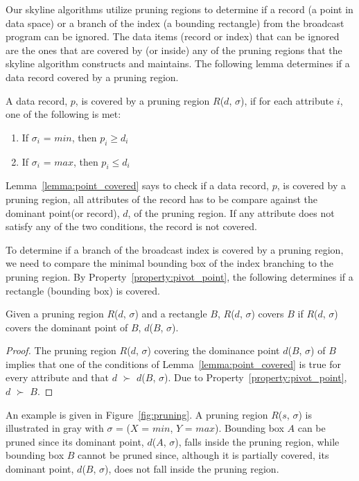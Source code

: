 Our skyline algorithms utilize pruning regions to determine if a record (a point in data space) or a branch of the index (a bounding rectangle) from the broadcast program can be ignored. The data items (record or index) that can be ignored are the ones that are covered by (or inside) any of the pruning regions that the skyline algorithm constructs and maintains. The following lemma determines if a data record covered by a pruning region.

\begin{lemma}\label{lemma:point_covered}
A data record, $p$, is covered by a pruning region $R$($d$, $\sigma$), if for each attribute $i$, one of the following is met:
\begin{enumerate}
  \item If $\sigma_i$ = $min$, then $p_i \geq d_i$
  \item If $\sigma_i$ = $max$, then $p_i \leq d_i$
\end{enumerate}
\end{lemma}

Lemma~\ref{lemma:point_covered} says to check if a data record, $p$, is covered by a pruning region, all attributes of the record has to be compare against the dominant point(or record), $d$, of the pruning region. If any attribute does not satisfy any of the two conditions, the record is not covered.

To determine if a branch of the broadcast index is covered by a pruning region, we need to compare the minimal bounding box of the index branching to the pruning region. By Property~\ref{property:pivot_point}, the following determines if a rectangle (bounding box) is covered.

\begin{lemma}\label{lemma:rect_covered}
Given a pruning region $R$($d$, $\sigma$) and a rectangle $B$, $R$($d$, $\sigma$) covers $B$ if $R$($d$, $\sigma$) covers the dominant point of $B$, $d$($B$, $\sigma$).
\end{lemma}

\begin{proof}
The pruning region $R$($d$, $\sigma$) covering the dominance point $d$($B$, $\sigma$) of $B$ implies that one of the conditions of Lemma~\ref{lemma:point_covered} is true for every attribute and that $d$ $\succ$ $d$($B$, $\sigma$). Due to Property~\ref{property:pivot_point}, $d$ $\succ$ $B$.
\end{proof}

An example is given in Figure~\ref{fig:pruning}. A pruning region $R$($s$, $\sigma$) is illustrated in gray with $\sigma$ = ($X$ = $min$, $Y$ = $max$). Bounding box $A$ can be pruned since its dominant point, $d$($A$, $\sigma$), falls inside the pruning region, while bounding box $B$ cannot be pruned since, although it is partially covered, its dominant point,  $d$($B$, $\sigma$), does not fall inside the pruning region.

